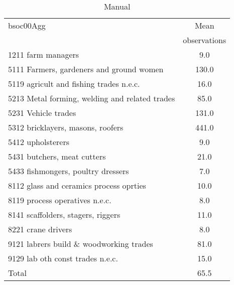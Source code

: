 \begin{table}
	\centering
	\caption{Manual}
	\begin{tabular}{lc}
	\toprule	
		
bsoc00Agg&Mean \\
&observations \\
\hline
1211 farm managers&9.0 \\
5111 Farmers, gardeners and ground women&130.0 \\
5119 agricult and fishing trades n.e.c.&16.0 \\
5213 Metal forming, welding and related trades&85.0 \\
5231 Vehicle trades&131.0 \\
5312 bricklayers, masons, roofers&441.0 \\
5412 upholsterers&9.0 \\
5431 butchers, meat cutters&21.0 \\
5433 fishmongers, poultry dressers&7.0 \\
8112 glass and ceramics process oprties&10.0 \\
8119 process operatives n.e.c.&8.0 \\
8141 scaffolders, stagers, riggers&11.0 \\
8221 crane drivers&8.0 \\
9121 labrers build \& woodworking trades&81.0 \\
9129 lab oth const trades n.e.c.&15.0 \\
Total&65.5 \\
\bottomrule
\bottomrule
\end{tabular}
\end{table}
